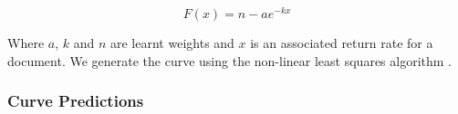 \begin{equation}
F(x) = n - ae^{-kx}
\end{equation}

Where $a$, $k$ and $n$ are learnt weights and $x$ is an associated return rate for a document. We generate the curve using the non-linear least squares algorithm \cite{leastsqures}. 

\subsubsection{Curve Predictions}

